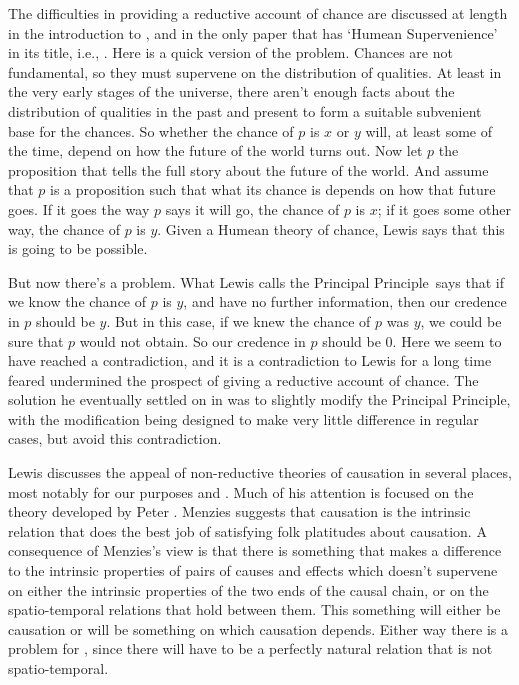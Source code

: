 The difficulties in providing a reductive account of  chance are discussed at length in the introduction to \citet{Lewis1986b}, and  in the only paper that has `Hum\-e\-an Supervenience'  in its title, i.e., \citet{Lewis1994a}. Here is a quick version of the problem. Chances are not fundamental, so they must supervene on the distribution of qualities. At least in the very early stages of the universe, there aren't enough facts about the distribution of qualities in the past and present  to form a suitable subvenient base for the chances. So whether the chance of $p$ is $x$ or $y$  will, at least some of the time, depend on how the future of the world turns out. Now let $p$  the proposition that tells the full story about the future of the world. And assume that $p$ is a proposition such that what its chance is depends on how that future goes. If it goes the way $p$ says it will go, the chance of $p$ is $x$; if it goes some other way, the chance of $p$ is $y$.  Given a Humean  theory of chance, Lewis says that this is going to be possible.

\newcommand{\PP}{Principal Principle}
But now there's a problem. What Lewis calls the \PP\  says that if we know the chance of $p$ is $y$,  and have no further information, then our credence in $p$ should be $y$.  But in this case, if we knew the chance of $p$ was $y$,  we could be sure that $p$  would not obtain. So our credence in $p$  should be 0.  Here we seem to have reached a contradiction, and it is a contradiction to Lewis for a long time feared undermined the prospect of giving a reductive account of chance.  The solution he eventually settled on in \citet{Lewis1994a} was to slightly modify the \PP, with the modification being designed to make very little difference in regular cases, but avoid this contradiction.

Lewis discusses the appeal of non-reductive theories of causation in several places, most notably for our purposes \citet{Lewis2004a} and \citet{Lewis2004d}.  Much of his attention is focused on the theory developed by Peter \citet{Menzies1996}.  Menzies suggests that causation is the intrinsic relation that does the best job of satisfying folk platitudes about causation. A  consequence of Menzies's view  is that there is something that makes a difference to the intrinsic properties of pairs of causes and effects which doesn't supervene on either the intrinsic properties of the two ends of the causal chain, or on the spatio-temporal relations that hold between them.  This something will either be causation or will be something on which causation depends. Either way there is a problem for \HS,  since there will have to be a  perfectly natural relation  that is not spatio-temporal.

